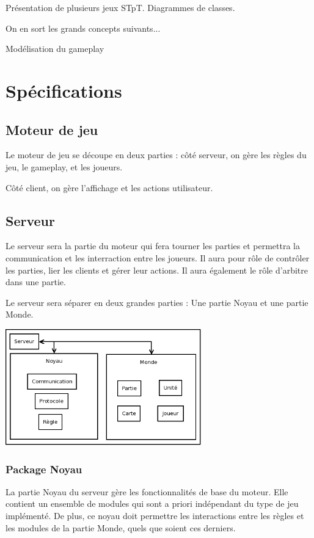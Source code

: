 \documentclass[a4paper,10pt]{report}
\begin{document}
    Présentation de plusieurs jeux STpT. Diagrammes de classes. 

    On en sort les grands concepts suivants... 

    Modélisation du gameplay

  \section{Spécifications}

    \subsection{Moteur de jeu}

      Le moteur de jeu se découpe en deux parties : côté serveur, on gère les règles du jeu, le gameplay, et les joueurs. 

      Côté client, on gère l'affichage et les actions utilisateur. 

    \subsection{Serveur}

      Le serveur sera la partie du moteur qui fera tourner les parties et permettra la communication et les interraction entre les joueurs. Il aura pour rôle de contrôler les parties, lier les clients et gérer leur actions. Il aura également le rôle d'arbitre dans une partie. 

      Le serveur sera séparer en deux grandes parties : Une partie Noyau et une partie Monde.

      \includegraphics[width=320px]{img/server-organisation.png}

      \subsubsection{Package Noyau}

	La partie Noyau du serveur gère les fonctionnalités de base du moteur. Elle contient un ensemble de modules qui sont a priori indépendant du type de jeu implémenté. De plus, ce noyau doit permettre les interactions entre les règles et les modules de la partie Monde, quels que soient ces derniers. 
\end{document}
